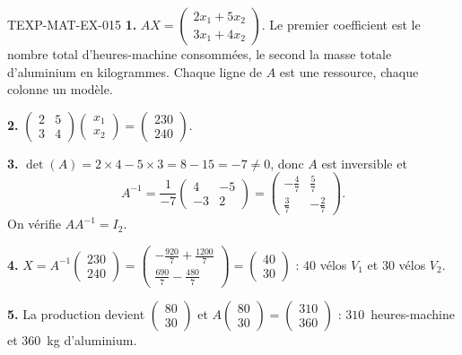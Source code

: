 \begin{corrige}{TEXP-MAT-EX-015}
\textbf{1.} $AX=\begin{pmatrix}2x_1+5x_2\\3x_1+4x_2\end{pmatrix}$. Le premier
coefficient est le nombre total d'heures-machine consommées, le second la masse
totale d'aluminium en kilogrammes. Chaque ligne de $A$ est une ressource, chaque
colonne un modèle.

\textbf{2.} $\begin{pmatrix}2&5\\3&4\end{pmatrix}\begin{pmatrix}x_1\\x_2\end{pmatrix}
=\begin{pmatrix}230\\240\end{pmatrix}$.

\textbf{3.} $\det(A)=2\times4-5\times3=8-15=-7\neq 0$, donc $A$ est inversible et
\[
  A^{-1}=\dfrac{1}{-7}\begin{pmatrix}4&-5\\-3&2\end{pmatrix}
  =\begin{pmatrix}-\tfrac47&\tfrac57\\[2pt]\tfrac37&-\tfrac27\end{pmatrix}.
\]
On vérifie $AA^{-1}=I_2$.

\textbf{4.} $X=A^{-1}\begin{pmatrix}230\\240\end{pmatrix}
=\begin{pmatrix}-\tfrac{920}{7}+\tfrac{1200}{7}\\[2pt]\tfrac{690}{7}-\tfrac{480}{7}\end{pmatrix}
=\begin{pmatrix}40\\30\end{pmatrix}$ : $40$ vélos $V_1$ et $30$ vélos $V_2$.

\textbf{5.} La production devient $\begin{pmatrix}80\\30\end{pmatrix}$ et
$A\begin{pmatrix}80\\30\end{pmatrix}=\begin{pmatrix}310\\360\end{pmatrix}$ :
$310$~heures-machine et $360$~kg d'aluminium.


\end{corrige}
